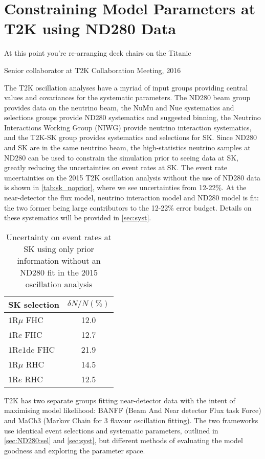 \chapter{Constraining Model Parameters at T2K using ND280 Data}
\label{chap:ND280}

\epigraph{At this point you're re-arranging deck chairs on the Titanic}{Senior collaborator at T2K Collaboration Meeting, 2016}

The T2K oscillation analyses have a myriad of input groups providing central values and covariances for the systematic parameters. The ND280 beam group provides data on the neutrino beam, the NuMu and Nue systematics and selections groups provide ND280 systematics and suggested binning, the Neutrino Interactions Working Group (NIWG) provide neutrino interaction systematics, and the T2K-SK group provides systematics and selections for SK. Since ND280 and SK are in the same neutrino beam, the high-statistics neutrino samples at ND280 can be used to constrain the simulation prior to seeing data at SK, greatly reducing the uncertainties on event rates at SK. The event rate uncertainties on the 2015 T2K oscillation analysis without the use of ND280 data is shown in \autoref{tab:sk_noprior}, where we see uncertainties from 12-22\%. At the near-detector the flux model, neutrino interaction model and ND280 model is fit: the two former being large contributors to the 12-22\% error budget. Details on these systematics will be provided in \autoref{sec:syst}. 
\begin{table}[h]
	\begin{tabular}{l | c}
		\hline
		\hline
		SK selection & $\delta N/N (\%)$ \\
		\hline
		$1\text{R}\mu$ FHC & 12.0 \\
		$1\text{R}e$ FHC & 12.7 \\
		$1\text{R}e1\text{d}e$ FHC & 21.9 \\
		\hline
		$1\text{R}\mu$ RHC & 14.5 \\
		$1\text{R}e$ RHC & 12.5 \\
		\hline
		\hline
	\end{tabular}
	\caption{Uncertainty on event rates at SK using only prior information without an ND280 fit in the 2015 oscillation analysis\cite{t2k_2015}}
	\label{tab:sk_noprior}
\end{table}

T2K has two separate groups fitting near-detector data with the intent of maximising model likelihood: BANFF (Beam And Near detector Flux task Force) and MaCh3 (Markov Chain for 3 flavour oscillation fitting). The two frameworks use identical event selections and systematic parameters, outlined in \autoref{sec:ND280:sel} and \autoref{sec:syst}, but different methods of evaluating the model goodness and exploring the parameter space.

